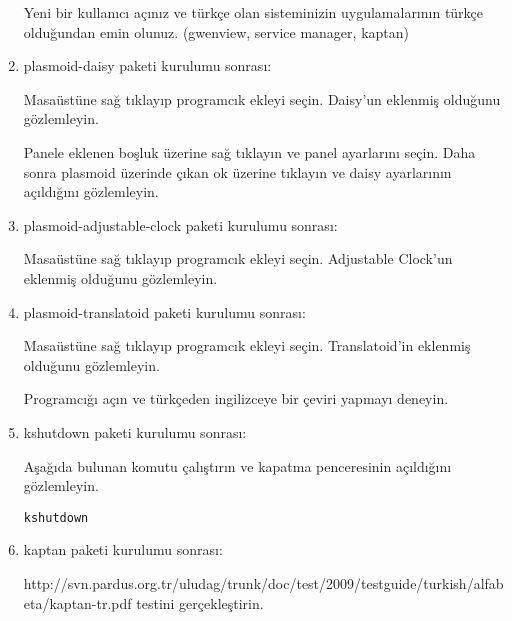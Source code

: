 \documentclass[a4paper,10pt]{article}
\begin{document}
\begin{enumerate}
Yeni bir kullanıcı açınız ve türkçe olan sisteminizin uygulamalarının türkçe olduğundan emin olunuz. (gwenview, service manager, kaptan)

\item plasmoid-daisy paketi kurulumu sonrası:

Masaüstüne sağ tıklayıp programcık ekleyi seçin. Daisy'un eklenmiş olduğunu gözlemleyin.

Panele eklenen boşluk üzerine sağ tıklayın ve panel ayarlarını seçin. Daha sonra plasmoid üzerinde çıkan ok üzerine tıklayın ve daisy ayarlarının açıldığını gözlemleyin.

 \item plasmoid-adjustable-clock paketi kurulumu sonrası:

Masaüstüne sağ tıklayıp programcık ekleyi seçin. Adjustable Clock'un eklenmiş olduğunu gözlemleyin.


 \item plasmoid-translatoid paketi kurulumu sonrası:

Masaüstüne sağ tıklayıp programcık ekleyi seçin. Translatoid'in eklenmiş olduğunu gözlemleyin.

Programcığı açın ve türkçeden ingilizceye bir çeviri yapmayı deneyin.
 \item kshutdown paketi kurulumu sonrası:

Aşağıda bulunan komutu çalıştırın ve kapatma penceresinin açıldığını gözlemleyin.
\begin{verbatim}
kshutdown 
\end{verbatim}

 \item kaptan paketi kurulumu sonrası:

  http://svn.pardus.org.tr/uludag/trunk/doc/test/2009/testguide/turkish/alfabeta/kaptan-tr.pdf testini gerçekleştirin.

\end{enumerate}
\end{document}
